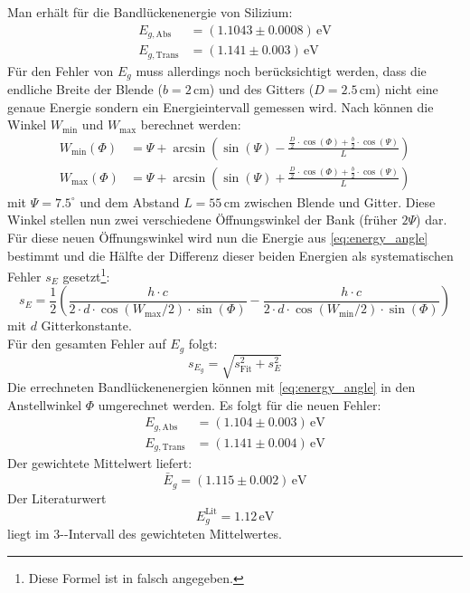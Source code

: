 Man erhält für die Bandlückenenergie von Silizium:
\begin{equation}
\begin{split}
  E_{g, \text{Abs}} &= (1.1043 \pm 0.0008)\,\text{eV} \\
  E_{g, \text{Trans}} &= (1.141 \pm 0.003)\,\text{eV}
\end{split}
\end{equation}
Für den Fehler von $E_g$ muss allerdings noch berücksichtigt werden, dass die endliche Breite der Blende ($b=2$\,cm) und 
des Gitters ($D=2.5$\,cm) nicht eine genaue Energie sondern ein Energieintervall gemessen wird. Nach \cite{staatsex} können 
die Winkel $W_\text{min}$ und $W_\text{max}$ berechnet werden: 
\begin{equation}
\begin{split}
  W_\text{min}(\Phi) &= \Psi + \arcsin \left( \sin(\Psi) - \frac{\frac{D}{2} \cdot \cos(\Phi) + \frac{b}{2} \cdot \cos(\Psi)}{L} \right) \\
  W_\text{max}(\Phi) &= \Psi + \arcsin \left( \sin(\Psi) + \frac{\frac{D}{2} \cdot \cos(\Phi) + \frac{b}{2} \cdot \cos(\Psi)}{L} \right) 
\end{split}
\end{equation}
mit $\Psi=7.5^\circ$ und dem Abstand $L=55$\,cm zwischen Blende und Gitter. Diese Winkel stellen nun zwei verschiedene Öffnungswinkel der Bank 
(früher $2\Psi$) dar. Für diese neuen Öffnungswinkel wird nun die Energie aus \autoref{eq:energy_angle} bestimmt und die Hälfte der Differenz 
dieser beiden Energien als systematischen Fehler $s_E$ gesetzt\footnote{Diese Formel ist in \cite{staatsex} falsch angegeben.}:
\begin{equation}
  s_E = \frac{1}{2} \left( \frac{h \cdot c}{2 \cdot d \cdot \cos(W_\text{max} / 2) \cdot \sin (\Phi)} - \frac{h \cdot c}{2 \cdot d \cdot \cos(W_\text{min} / 2) \cdot \sin (\Phi)} \right) 
\end{equation}
mit $d$ Gitterkonstante.\\
Für den gesamten Fehler auf $E_g$ folgt:
\begin{equation}
  s_{E_g} = \sqrt{s_\text{Fit}^2 + s_E^2}
\end{equation}
Die errechneten Bandlückenenergien können mit \autoref{eq:energy_angle} in den Anstellwinkel $\Phi$ umgerechnet werden. Es folgt für die 
neuen Fehler:
\begin{equation}
\begin{split}
  E_{g, \text{Abs}} &= (1.104 \pm 0.003)\,\text{eV} \\
  E_{g, \text{Trans}} &= (1.141 \pm 0.004)\,\text{eV}
\end{split}
\end{equation}
Der gewichtete Mittelwert liefert:
\begin{equation}
  \bar{E}_g = (1.115 \pm 0.002)\,\text{eV}
\end{equation}
Der Literaturwert
\begin{equation}
  E_g^{\text{Lit}} = 1.12\,\text{eV}
\end{equation}
liegt im 3-\textsigma -Intervall des gewichteten Mittelwertes.


